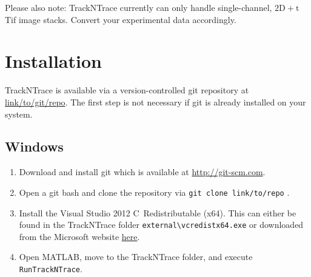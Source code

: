 \documentclass[11pt,onside]{report}
\numberwithin{equation}{chapter}
\def\CC{{C\nolinebreak[4]\hspace{-.05em}\raisebox{.3ex}{\tiny\bf ++}}}
\begin{document}
Please also note: TrackNTrace currently can only handle single-channel, $\mathrm{2D}+\mathrm{t}$ Tif image stacks. Convert your experimental data accordingly. \clearpage%

\tableofcontents \clearpage

\section{Installation}\label{sec:install}
TrackNTrace is available via a version-controlled git repository at \url{link/to/git/repo}. The first step is not necessary if git is already installed on your system.
\subsection{Windows}
\begin{enumerate}
\item Download and install git which is available at \url{http://git-scm.com}.
\item Open a git bash and clone the repository via \texttt{git clone link/to/repo} .
\item Install the Visual Studio 2012 \CC~Redistributable (x64). This can either be found in the TrackNTrace folder \texttt{external\textbackslash vcredist\textunderscore x64.exe} or downloaded from the Microsoft website \href{https://www.microsoft.com/en-us/download/details.aspx?id=30679}{here}.
\item Open MATLAB, move to the TrackNTrace folder, and execute \texttt{RunTrackNTrace}.
\end{enumerate}
\end{document}
